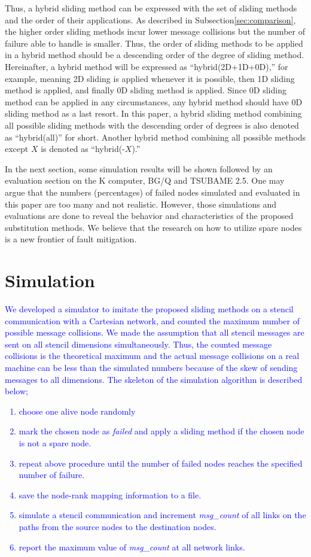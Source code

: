 \documentclass[Afour,times,sagev]{sagej}
\newcommand{\AH}[1]{%
  \textcolor{blue}{#1}}%
\begin{document}
Thus, a hybrid sliding method can be expressed with the set of sliding
methods and the order of their applications. As described in
Subsection\ref{sec:comparison}, the higher order sliding methods incur
lower message collisions but the number of failure able to
handle is smaller. Thus, the order of sliding methods to be applied in
a hybrid method should be a descending order of the degree of sliding
method. Hereinafter, a hybrid method will be expressed as
``hybrid(2D+1D+0D),'' for example, meaning 2D sliding is applied
whenever it is possible, then 1D sliding method is applied, and
finally 0D sliding method is applied. Since 0D sliding method can be
applied in any circumstances, any hybrid method should have 0D sliding
method as a last resort. In this paper, a hybrid sliding method
combining all possible sliding methods with the descending order of
degrees is also denoted as ``hybrid(all)'' for short. Another hybrid
method combining all possible methods except $X$ is denoted as
``hybrid(-$X$).''

In the next section, some simulation results will be shown followed by
an evaluation section on the K computer, BG/Q and TSUBAME
2.5\cite{tsubame}. One may
argue that the numbers (percentages) of failed nodes simulated and
evaluated in this paper are too many and not realistic. However,
those simulations and evaluations are done to reveal the behavior and
characteristics of the proposed substitution methods. We believe that
the research on how to utilize spare nodes is a new frontier of fault
mitigation.

\section{Simulation}\label{sec:sim}

\AH{
We developed a simulator to imitate the proposed sliding methods on a
stencil communication with a Cartesian network, and counted the maximum
number of possible message collisions. We made the assumption that all stencil
messages are sent on all stencil dimensions simultaneously. Thus, the
counted message collisions is the theoretical maximum and the actual
message collisions on a real machine can be less than the simulated
numbers because of the skew of sending messages to all dimensions. The
skeleton of the simulation algorithm is described below;}

\AH{
\begin{enumerate}
\item choose one alive node randomly
\item mark the chosen node as {\it failed} and apply a sliding
  method if the chosen node is not a spare node.
\item repeat above procedure until the number of failed nodes reaches
  the specified number of failure.
\item save the node-rank mapping information to a file.
\item simulate a stencil communication and increment {\it
    msg\_count} of all links on the paths from the source nodes to the
  destination nodes.
\item report the maximum value of {\it msg\_count} at all network links.
\end{enumerate}
}
\end{document}
